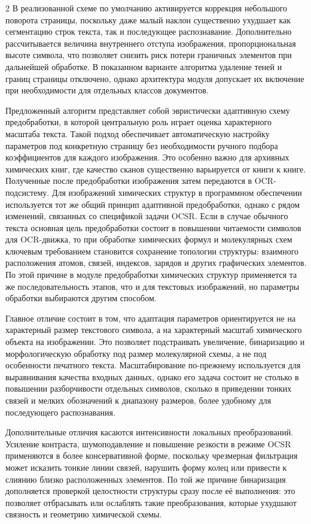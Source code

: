 \documentclass[11pt]{article}
\begin{document}
\begin{multicols}{2}
В реализованной схеме по умолчанию активируется коррекция небольшого поворота страницы, поскольку даже малый наклон существенно ухудшает как сегментацию строк текста, так и последующее распознавание. Дополнительно рассчитывается величина внутреннего отступа изображения, пропорциональная высоте символа, что позволяет снизить риск потери граничных элементов при дальнейшей обработке. В показанном варианте алгоритма удаление теней и границ страницы отключено, однако архитектура модуля допускает их включение при необходимости для отдельных классов документов.

Предложенный алгоритм представляет собой эвристически адаптивную схему предобработки, в которой центральную роль играет оценка характерного масштаба текста. Такой подход обеспечивает автоматическую настройку параметров под конкретную страницу без необходимости ручного подбора коэффициентов для каждого изображения. Это особенно важно для архивных химических книг, где качество сканов существенно варьируется от книги к книге. Полученные после предобработки изображения затем передаются в OCR-подсистему. 
Для изображений химических структур в программном обеспечении используется тот же общий принцип адаптивной предобработки, однако с рядом изменений, связанных со спецификой задачи OCSR. Если в случае обычного текста основная цель предобработки состоит в повышении читаемости символов для OCR-движка, то при обработке химических формул и молекулярных схем ключевым требованием становится сохранение топологии структуры: взаимного расположения атомов, связей, индексов, зарядов и других графических элементов. По этой причине в модуле предобработки химических структур применяется та же последовательность этапов, что и для текстовых изображений, но параметры обработки выбираются другим способом.

Главное отличие состоит в том, что адаптация параметров ориентируется не на характерный размер текстового символа, а на характерный масштаб химического объекта на изображении. Это позволяет подстраивать увеличение, бинаризацию и морфологическую обработку под размер молекулярной схемы, а не под особенности печатного текста. Масштабирование по-прежнему используется для выравнивания качества входных данных, однако его задача состоит не столько в повышении разборчивости отдельных символов, сколько в приведении тонких связей и мелких обозначений к диапазону размеров, более удобному для последующего распознавания.

Дополнительные отличия касаются интенсивности локальных преобразований. Усиление контраста, шумоподавление и повышение резкости в режиме OCSR применяются в более консервативной форме, поскольку чрезмерная фильтрация может исказить тонкие линии связей, нарушить форму колец или привести к слиянию близко расположенных элементов. По той же причине бинаризация дополняется проверкой целостности структуры сразу после её выполнения: это позволяет отбрасывать или ослаблять такие преобразования, которые ухудшают связность и геометрию химической схемы.


\end{multicols}
\end{document}
